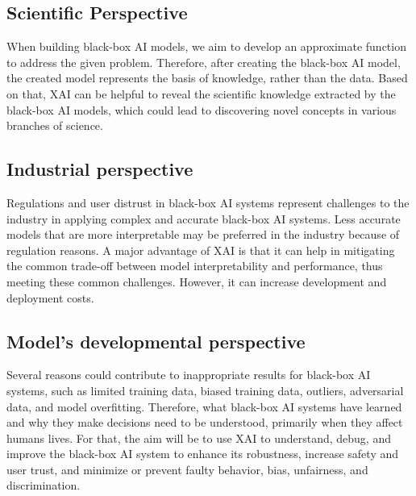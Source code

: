 \subsection*{Scientific Perspective}
When building black-box AI models, we aim to develop an approximate function to address the given problem. 
Therefore, after creating the black-box AI model, the created model represents the basis of knowledge, rather than the data. 
Based on that, XAI can be helpful to reveal the scientific knowledge extracted by the black-box AI models, which could lead to discovering novel
concepts in various branches of science.

\subsection*{Industrial perspective}
Regulations and user distrust in black-box AI systems represent challenges to the industry in applying complex and accurate 
black-box AI systems. Less accurate models that are more interpretable may be preferred in the industry because of regulation
reasons. A major advantage of XAI is that it can help in mitigating the common trade-off between model interpretability and performance,
thus meeting these common challenges. 
However, it can increase development and deployment costs.

\subsection*{Model's developmental perspective}
Several reasons could contribute to inappropriate results for black-box AI systems, such as limited training data, biased training data, outliers, adversarial data, and model overfitting. 
Therefore, what black-box AI systems have learned and why they make decisions need to be understood, primarily when they affect humans lives. 
For that, the aim will be to use XAI to understand, debug, and improve the black-box AI system to enhance its robustness, increase safety and user trust, and minimize or prevent faulty behavior, bias, unfairness, and discrimination.

